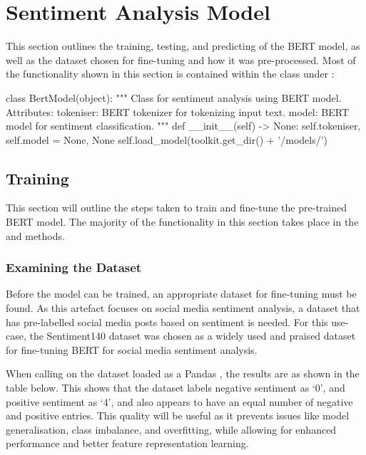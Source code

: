 \section{Sentiment Analysis Model}
This section outlines the training, testing, and predicting of the BERT model, as well as the dataset chosen for fine-tuning and how it was pre-processed. Most of the functionality shown in this section is contained within the  class under :

\begin{python}
class BertModel(object):
    """
    Class for sentiment analysis using BERT model.
    Attributes:
        tokeniser: BERT tokenizer for tokenizing input text.
        model: BERT model for sentiment classification.
    """
    def __init__(self) -> None:
        self.tokeniser, self.model = None, None
        self.load_model(toolkit.get_dir() + '/models/')
\end{python}

    \subsection{Training}
        This section will outline the steps taken to train and fine-tune the pre-trained BERT model. The majority of the functionality in this section takes place in the  and  methods.

        \subsubsection{Examining the Dataset}
        Before the model can be trained, an appropriate dataset for fine-tuning must be found. As this artefact focuses on social media sentiment analysis, a dataset that has pre-labelled social media posts based on sentiment is needed. For this use-case, the Sentiment140 dataset \citet{sentiment140dataset} was chosen as a widely used and praised dataset for fine-tuning BERT for social media sentiment analysis.

        When calling  on the dataset loaded as a Pandas , the results are as shown in the table below. This shows that the dataset labels negative sentiment as `0', and positive sentiment as `4', and also appears to have an equal number of negative and positive entries. This quality will be useful as it prevents issues like model generalisation, class imbalance, and overfitting, while allowing for enhanced performance and better feature representation learning.

